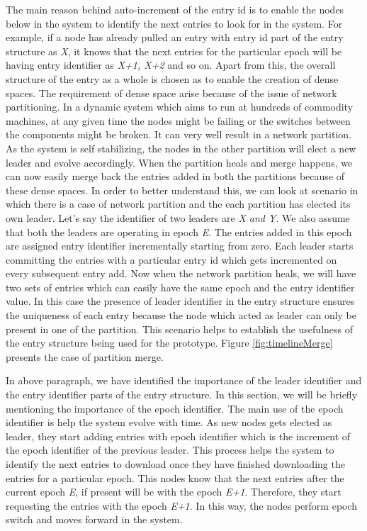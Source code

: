 \documentclass[12pt,a4paper,twoside,openright]{book}
\begin{document}
\par The main reason behind auto-increment of the entry id is to enable the nodes below in the system to identify the next entries to look for in the system. For example, if a node has already pulled an entry with entry id part of the entry structure as \textit{X}, it knows that the next entries for the particular epoch will be having entry identifier as \textit{X+1, X+2} and so on. Apart from this, the overall structure of the entry as a whole is chosen as to enable the creation of dense spaces. The requirement of dense space arise because of the issue of network partitioning. In a dynamic system which aims to run at hundreds of commodity machines, at any given time the nodes might be failing or the switches between the components might be broken. It can very well result in a network partition. As the system is self stabilizing, the nodes in the other partition will elect a new leader and evolve accordingly. When the partition heals and merge happens, we can now easily merge back the entries added in both the partitions because of these dense spaces. In order to better understand this, we can look at scenario in which there is a case of network partition and the each partition has elected its own leader. Let's say the identifier of two leaders are \textit{X and Y}. We also assume that both the leaders are operating in epoch \textit{E}. The entries added in this epoch are assigned entry identifier  incrementally starting from zero. Each leader starts committing the entries with a particular entry id which gets incremented on every subsequent entry add. Now when the network partition heals, we will have two sets of entries which can easily have the same epoch and the entry identifier value. In this case the presence of leader identifier in the entry structure ensures the uniqueness of each entry because the node which acted as leader can only be present in one of the partition. This scenario helps to establish the usefulness of the entry structure being used for the prototype. Figure \ref{fig:timelineMerge} presents the case of partition merge.

\par In above paragraph, we have identified the importance of the leader identifier and the entry identifier parts of the entry structure. In this section, we will be briefly mentioning the importance of the epoch identifier. The main use of the epoch identifier is help the system evolve with time. As new nodes gets elected as leader, they start adding entries with epoch identifier which is the increment of the epoch identifier of the previous leader. This process helps the system to identify the next entries to download once they have finished downloading the entries for a particular epoch. This nodes know that the next entries after the current epoch \textit{E}, if present will be with the epoch \textit{E+1}. Therefore, they start requesting the entries with the epoch \textit{E+1}. In this way, the nodes perform epoch switch and moves forward in the system.
\end{document}
